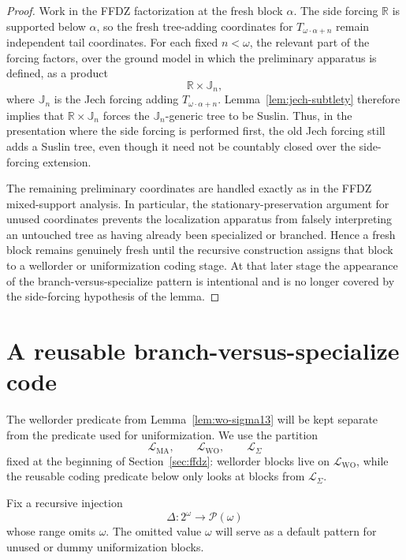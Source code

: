 \documentclass[11pt]{article}
\theoremstyle{plain}
\theoremstyle{definition}
\theoremstyle{remark}
\begin{document}
\begin{proof}
Work in the FFDZ factorization at the fresh block \(\alpha\).  The side forcing
\(\mathbb R\) is supported below \(\alpha\), so the fresh tree-adding coordinates
for \(T_{\omega\cdot\alpha+n}\) remain independent tail coordinates.  For each
fixed \(n<\omega\), the relevant part of the forcing factors, over the ground
model in which the preliminary apparatus is defined, as a product
\[
   \mathbb R\times\mathbb J_n,
\]
where \(\mathbb J_n\) is the Jech forcing adding
\(T_{\omega\cdot\alpha+n}\).  Lemma~\ref{lem:jech-subtlety} therefore implies
that \(\mathbb R\times\mathbb J_n\) forces the \(\mathbb J_n\)-generic tree to be
Suslin.  Thus, in the presentation where the side forcing is performed first,
the old Jech forcing still adds a Suslin tree, even though it need not be
countably closed over the side-forcing extension.

The remaining preliminary coordinates are handled exactly as in the FFDZ
mixed-support analysis.  In particular, the stationary-preservation argument for
unused coordinates prevents the localization apparatus from falsely interpreting
an untouched tree as having already been specialized or branched.  Hence a fresh
block remains genuinely fresh until the recursive construction assigns that
block to a wellorder or uniformization coding stage.  At that later stage the
appearance of the branch-versus-specialize pattern is intentional and is no
longer covered by the side-forcing hypothesis of the lemma.
\end{proof}

\section{A reusable branch-versus-specialize code}\label{sec:psi-three}

The wellorder predicate from Lemma~\ref{lem:wo-sigma13} will be kept separate
from the predicate used for uniformization.  We use the partition
\[
\mathcal L_{\mathrm{MA}},\qquad \mathcal L_{\mathrm{WO}},\qquad
\mathcal L_{\Sigma}
\]
fixed at the beginning of Section~\ref{sec:ffdz}: wellorder blocks live on
$\mathcal L_{\mathrm{WO}}$, while the reusable coding predicate below only looks
at blocks from $\mathcal L_{\Sigma}$.

Fix a recursive injection
\[
\Delta:2^\omega\longrightarrow\mathcal P(\omega)
\]
whose range omits $\omega$.  The omitted value $\omega$ will serve as a default
pattern for unused or dummy uniformization blocks.
\end{document}
